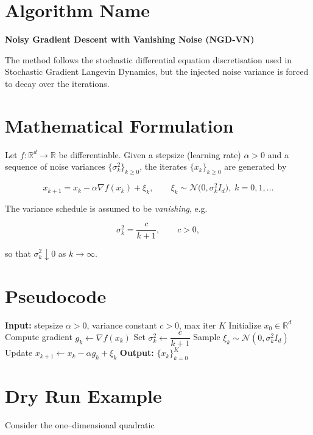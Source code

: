 \documentclass{article}
\newcommand{\R}{\mathbb{R}}
\begin{document}
\section*{Algorithm Name}
\textbf{Noisy Gradient Descent with Vanishing Noise (NGD‑VN)}  

The method follows the stochastic differential equation discretisation used in Stochastic Gradient Langevin Dynamics, but the injected noise variance is forced to decay over the iterations.

\section*{Mathematical Formulation}
Let $f:\R^{d}\rightarrow\R$ be differentiable.  
Given a stepsize (learning rate) $\alpha>0$ and a sequence of noise variances $\{\sigma_{k}^{2}\}_{k\ge 0}$, the iterates $\{x_{k}\}_{k\ge0}$ are generated by  

\[
\boxed{
x_{k+1}=x_{k}-\alpha \nabla f(x_{k})+\xi_{k},\qquad 
\xi_{k}\sim\mathcal{N}\!\big(0,\sigma_{k}^{2}I_{d}\big),\;k=0,1,\dots
}
\tag{1}
\]

The variance schedule is assumed to be \emph{vanishing}, e.g.  

\[
\sigma_{k}^{2}= \frac{c}{k+1},\qquad c>0,
\tag{2}
\]

so that $\sigma_{k}^{2}\downarrow0$ as $k\to\infty$.

\section*{Pseudocode}
\begin{algorithm}[H]
\caption{NGD‑VN}
\begin{algorithmic}[1]
\State \textbf{Input:} stepsize $\alpha>0$, variance constant $c>0$, max iter $K$
\State Initialize $x_{0}\in\R^{d}$
    \State Compute gradient $g_{k}\gets\nabla f(x_{k})$
    \State Set $\sigma_{k}^{2}\gets \dfrac{c}{k+1}$                
    \State Sample $\xi_{k}\sim\mathcal N(0,\sigma_{k}^{2}I_{d})$
    \State Update $x_{k+1}\gets x_{k}-\alpha g_{k}+\xi_{k}$
\EndFor
\State \textbf{Output:} $\{x_{k}\}_{k=0}^{K}$
\end{algorithmic}
\end{algorithm}

\section*{Dry Run Example}
Consider the one–dimensional quadratic  
\end{document}
